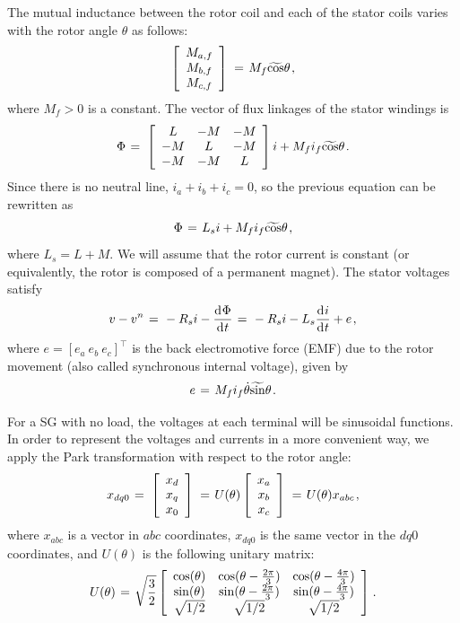 \documentclass[conference]{IEEEtran}
\newcommand{\BE}{\begin{equation}}
\newcommand{\BEQ}[1]{\BE\label{#1}} %
\newcommand{\m}      {{\hbox{\hskip 1pt}}}
\newcommand{\dd}     {{\rm d\hbox{\hskip 0.5pt}}}
\begin{document}
The mutual inductance between the rotor coil and each of the stator
coils varies with the rotor angle $\theta$ as follows:
$$ \left[\begin{array}{c} M_{a,f}\\ M_{b,f}\\ M_{c,f}\end{array}
   \right] \m=\m M_{f}\widetilde{\cos}\theta \m,$$
where $M_f>0$ is a constant. The vector of flux linkages of the stator
windings is
$$ \Phi \m=\m \left[\begin{array}{ccc} L & -M & -M\\ -M & L & -M\\
   -M & -M & L \end{array}\right]i + M_f i_f\widetilde{\cos}\theta
   \m.$$
Since there is no neutral line, $i_a+i_b+i_c=0$, so the previous
equation can be rewritten as 
$$\Phi \m=\m L_s i + M_f i_f \widetilde{\cos}\theta \m,$$
where $L_s=L+M$. We will assume that the rotor current is constant
(or equivalently, the rotor is composed of a permanent magnet). The
stator voltages satisfy
\BEQ{eq:SGTerminalVlotage}
   v - v^n \m=\m -R_{s}i-\frac{\dd\Phi}{\dd t} \m=\m -R_{s}i-L_{s}
   \frac{\dd i}{\dd t} + e \m,
\end{equation}
where $e=\left[e_a\ e_b\ e_c \right] ^\top$ is the back electromotive 
force (EMF) due to the rotor movement (also called synchronous 
internal voltage), given by \vspace{-2mm}
\BEQ{eq:emf}
   e \m=\m M_f i_f\dot{\theta}\widetilde{\sin}\theta \m.
\end{equation}

For a SG with no load, the voltages at each terminal
will be sinusoidal functions. In order to represent the voltages and
currents in a more convenient way, we apply the Park transformation
with respect to the rotor angle:
$$ x_{dq0} \m=\m \left[\begin{array}{c} x_{d}\\ x_{q}\\ x_{0}
   \end{array}\right] \m=\m U(\theta) \left[\begin{array}{c} x_{a}\\
   x_b\\ x_c\end{array}\right] \m=\m U(\theta) x_{abc} \m,$$
where $x_{abc}$ is a vector in $abc$ coordinates, $x_{dq0}$
is the same vector in the $dq0$ coordinates, and $U(\theta)$ is the
following unitary matrix:
$$ U(\theta) \m=\m \sqrt{\frac{3}{2}}\left[\begin{array}{ccc}
   \cos(\theta) & \cos(\theta-\frac{2\pi}{3}) & \cos(\theta-
   \frac{4\pi}{3})\\ \sin(\theta) & \sin(\theta-\frac{2\pi}{3})
   & \sin(\theta-\frac{4\pi}{3})\\ \sqrt{1/2} & \sqrt{1/2} & 
   \sqrt{1/2} \end{array}\right] \m.$$
\end{document}
